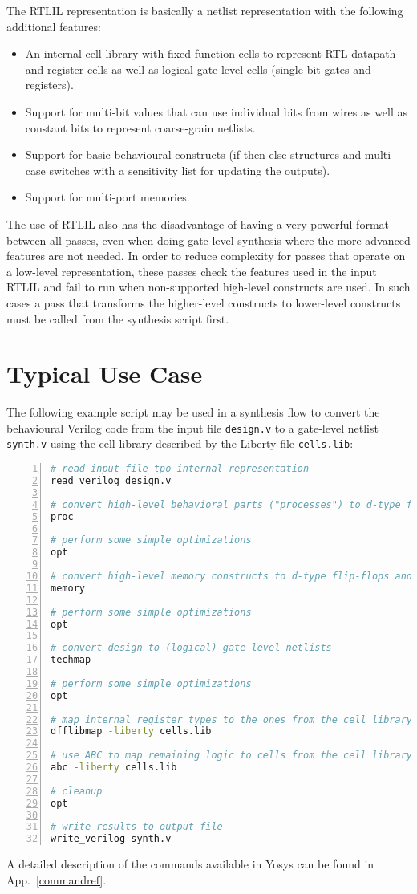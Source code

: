The RTLIL representation is basically a netlist representation with the following additional features:

\begin{itemize}
\item An internal cell library with fixed-function cells to represent RTL datapath and register cells as well
as logical gate-level cells (single-bit gates and registers).
\item Support for multi-bit values that can use individual bits from wires as well as constant bits to
represent coarse-grain netlists.
\item Support for basic behavioural constructs (if-then-else structures and multi-case switches with
a sensitivity list for updating the outputs).
\item Support for multi-port memories.
\end{itemize}

The use of RTLIL also has the disadvantage of having a very powerful format
between all passes, even when doing gate-level synthesis where the more
advanced features are not needed. In order to reduce complexity for passes that
operate on a low-level representation, these passes check the features used in
the input RTLIL and fail to run when non-supported high-level constructs are
used. In such cases a pass that transforms the higher-level constructs to
lower-level constructs must be called from the synthesis script first.

\section{Typical Use Case}
\label{sec:typusecase}

The following example script may be used in a synthesis flow to convert the behavioural Verilog code
from the input file {\tt design.v} to a gate-level netlist {\tt synth.v} using the cell library
described by the Liberty file  {\tt cells.lib}:

\begin{lstlisting}[language=sh,numbers=left,frame=single]
# read input file tpo internal representation
read_verilog design.v

# convert high-level behavioral parts ("processes") to d-type flip-flops and muxes
proc

# perform some simple optimizations
opt

# convert high-level memory constructs to d-type flip-flops and multiplexers
memory

# perform some simple optimizations
opt

# convert design to (logical) gate-level netlists
techmap

# perform some simple optimizations
opt

# map internal register types to the ones from the cell library
dfflibmap -liberty cells.lib

# use ABC to map remaining logic to cells from the cell library
abc -liberty cells.lib

# cleanup
opt

# write results to output file
write_verilog synth.v
\end{lstlisting}

A detailed description of the commands available in Yosys can be found in App.~\ref{commandref}.

